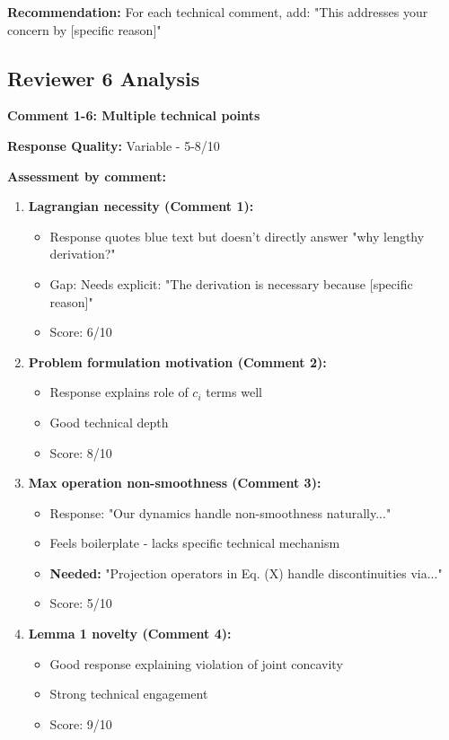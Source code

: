 \documentclass[11pt]{article}
\begin{document}
\textbf{Recommendation:} For each technical comment, add: "This addresses your concern by [specific reason]"

\subsection{Reviewer 6 Analysis}

\textbf{Comment 1-6: Multiple technical points}

\textbf{Response Quality:} \textcolor{warning}{Variable - 5-8/10}

\textbf{Assessment by comment:}

\begin{enumerate}
\item \textbf{Lagrangian necessity (Comment 1):}
   \begin{itemize}
   \item Response quotes blue text but doesn't directly answer "why lengthy derivation?"
   \item \textcolor{warning}{Gap:} Needs explicit: "The derivation is necessary because [specific reason]"
   \item Score: 6/10
   \end{itemize}

\item \textbf{Problem formulation motivation (Comment 2):}
   \begin{itemize}
   \item Response explains role of $c_i$ terms well
   \item Good technical depth
   \item Score: 8/10
   \end{itemize}

\item \textbf{Max operation non-smoothness (Comment 3):}
   \begin{itemize}
   \item Response: "Our dynamics handle non-smoothness naturally..."
   \item \textcolor{warning}{Feels boilerplate} - lacks specific technical mechanism
   \item \textbf{Needed:} "Projection operators in Eq. (X) handle discontinuities via..."
   \item Score: 5/10
   \end{itemize}

\item \textbf{Lemma 1 novelty (Comment 4):}
   \begin{itemize}
   \item Good response explaining violation of joint concavity
   \item Strong technical engagement
   \item Score: 9/10
   \end{itemize}
\end{enumerate}
\end{document}
